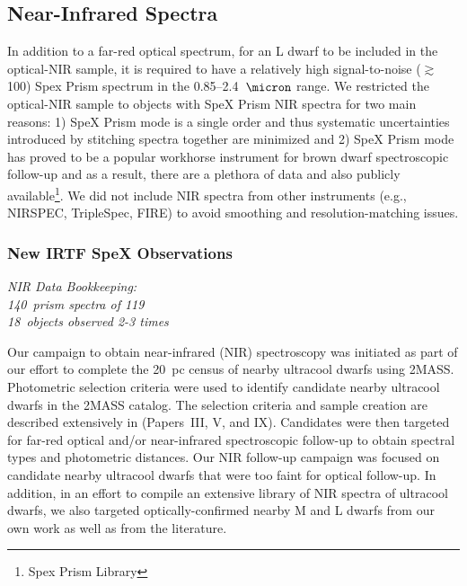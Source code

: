 \documentclass[12pt,preprint]{aastex}
\newcommand{\prismspectra}{140} %
\newcommand{\dupes}{18} %
\newcommand{\objects}{119} %
\begin{document}
\subsection{Near-Infrared Spectra}
In addition to a far-red optical spectrum, for an L dwarf to be included in the optical-NIR sample, it is required to have a relatively high signal-to-noise ($\gtrsim$100) Spex Prism spectrum in the 0.85--2.4~$\micron$ range.
We restricted the optical-NIR sample to objects with SpeX Prism NIR spectra for two main reasons: 1) SpeX Prism mode is a single order and thus systematic uncertainties introduced by stitching spectra together are minimized and 2) SpeX Prism mode has proved to be a popular workhorse instrument for brown dwarf spectroscopic follow-up and as a result, there are a plethora of data and also publicly available\footnote{Spex Prism Library}. We did not include NIR spectra from other instruments (e.g., NIRSPEC, TripleSpec, FIRE) to avoid smoothing and resolution-matching issues.


\subsubsection{New IRTF SpeX Observations}
\label{sec:obs_new_nir}

\emph{NIR Data Bookkeeping: \\
\prismspectra~prism spectra of \objects \\
\dupes~objects observed 2-3 times}

Our campaign to obtain near-infrared (NIR) spectroscopy was initiated as part of our effort to complete the 20~pc census of nearby ultracool dwarfs using 2MASS. Photometric selection criteria were used to identify candidate nearby ultracool dwarfs in the 2MASS catalog. The selection criteria and sample creation are described extensively in \cite{Cruz03,Cruz07,Reid08} (Papers~III, V, and IX). Candidates were then targeted for far-red optical and/or near-infrared spectroscopic follow-up to obtain spectral types and photometric distances. Our NIR follow-up campaign was focused on candidate nearby ultracool dwarfs that were too faint for optical follow-up. In addition, in an effort to compile an extensive library of NIR spectra of ultracool dwarfs, we also targeted optically-confirmed nearby M and L dwarfs from our own work as well as from the literature. 
\end{document}
